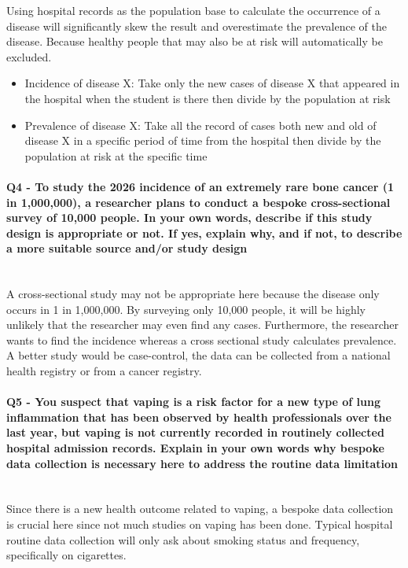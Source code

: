 \documentclass{article}
\begin{document}
Using hospital records as the population base to calculate the occurrence of a disease will significantly skew the result and overestimate the prevalence of the disease. Because healthy people that may also be at risk will automatically be excluded.
\begin{itemize}
    \item Incidence of disease X: Take only the new cases of disease X that appeared in the hospital when the student is there then divide by the population at risk
    \item Prevalence of disease X: Take all the record of cases both new and old of disease X in a specific period of time from the hospital then divide by the population at risk at the specific time
\end{itemize}

\paragraph{Q4 - To study the 2026 incidence of an extremely rare bone cancer (1 in 1,000,000), a researcher plans to conduct a bespoke cross-sectional survey of 10,000 people. In your own words, describe if this study design is appropriate or not. If yes, explain why, and if not, to describe a more suitable source and/or study design} \mbox{} \\

A cross-sectional study may not be appropriate here because the disease only occurs in 1 in 1,000,000. By surveying only 10,000 people, it will be highly unlikely that the researcher may even find any cases. Furthermore, the researcher wants to find the incidence whereas a cross sectional study calculates prevalence. A better study would be case-control, the data can be collected from a national health registry or from a cancer registry.

\paragraph{Q5 - You suspect that vaping is a risk factor for a new type of lung inflammation that has been observed by health professionals over the last year, but vaping is not currently recorded in routinely collected hospital admission records. Explain in your own words why bespoke data collection is necessary here to address the routine data limitation} \mbox{} \\

Since there is a new health outcome related to vaping, a bespoke data collection is crucial here since not much studies on vaping has been done. Typical hospital routine data collection will only ask about smoking status and frequency, specifically on cigarettes. 
\end{document}
